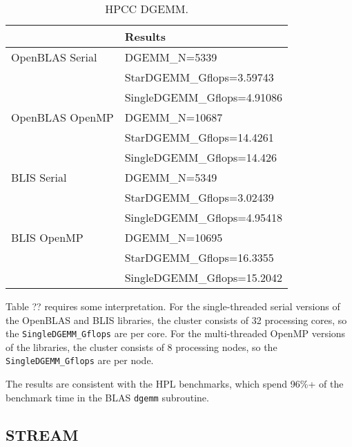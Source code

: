 \begin{table}[H]
\begin{center}
\begin{tabular}{ |l|l| } 
\hline
                & Results \\ 
\hline
OpenBLAS Serial & DGEMM\_N=5339 \\
                & StarDGEMM\_Gflops=3.59743 \\
                & SingleDGEMM\_Gflops=4.91086 \\
\hline
OpenBLAS OpenMP & DGEMM\_N=10687 \\
                & StarDGEMM\_Gflops=14.4261 \\
                & SingleDGEMM\_Gflops=14.426 \\
\hline
BLIS Serial     & DGEMM\_N=5349 \\
                & StarDGEMM\_Gflops=3.02439 \\
                & SingleDGEMM\_Gflops=4.95418 \\
\hline
BLIS OpenMP     & DGEMM\_N=10695 \\
                & StarDGEMM\_Gflops=16.3355 \\
                & SingleDGEMM\_Gflops=15.2042 \\
\hline
\end{tabular}
\end{center}
\caption{\label{tab:table-name}HPCC DGEMM.}
\end{table}

Table ?? requires some interpretation. For the single-threaded serial versions of the OpenBLAS and BLIS libraries, the cluster consists of 32 processing cores, so the \verb|SingleDGEMM_Gflops| are per core. For the multi-threaded OpenMP versions of the libraries, the cluster consists of 8 processing nodes, so the \verb|SingleDGEMM_Gflops| are per node.

The results are consistent with the HPL benchmarks, which spend 96\%+ of the benchmark time in the BLAS \verb|dgemm| subroutine. 


%
%
\subsection{STREAM}

